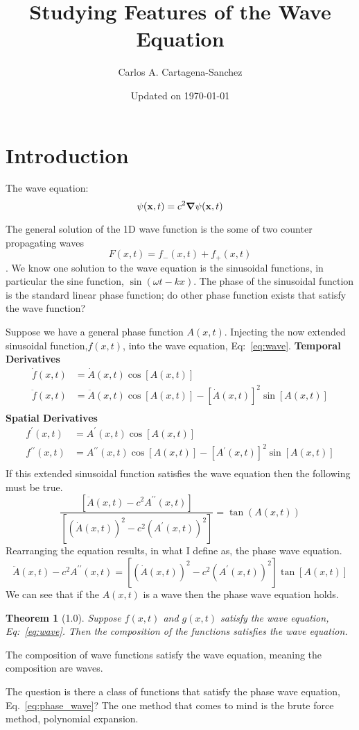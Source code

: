 \documentclass[12pt,reqno]{amsart}
\title{Studying Features of the Wave Equation}
\author{Carlos A. Cartagena-Sanchez}
\date{Updated on \today}
\newcommand*{\sprime}{^\ensuremath{\prime}}
\newcommand*{\dprime}{^{\ensuremath{\prime\prime}}}
\newcommand{\argument}{(\vb{x}, t)}
\newcommand{\argOne}{(x, t)}
\newtheorem*{theorem*}{Theorem}
\begin{document}
\maketitle

\section{Introduction}
The wave equation:
\begin{equation}\label{eq:wave}
    \psi \argument = c^2\grad{\psi \argument}
\end{equation}

The general solution of the 1D wave function is the some of two counter propagating waves\[F\argOne = f_-\argOne + f_+\argOne\].
We know one solution to the wave equation is the sinusoidal functions, in particular the sine function, $\sin{(\omega t - kx)}$. The phase of the sinusoidal function is the standard linear phase function; do other phase function exists that satisfy the wave function?

Suppose we have a general phase function $A\argOne$. Injecting the now extended sinusoidal function,$f\argOne$, into the wave equation, Eq:~\ref{eq:wave}.
\textbf{Temporal Derivatives}
\begin{align*}
    \dot{f}\argOne &= \dot A\argOne \cos[ A\argOne]\\
    \ddot{f}\argOne &= \ddot{A} \argOne \cos[ A\argOne] - [\dot A\argOne]^2\sin[A\argOne]\\
\end{align*}
\textbf{Spatial Derivatives}
\begin{align*}
    f\sprime \argOne &= A\sprime \argOne \cos[ A\argOne]\\
    f{\dprime}\argOne &= A{\dprime}\argOne \cos[ A\argOne] - [A{\sprime}\argOne]^2\sin[A\argOne]\\
\end{align*}
If this extended sinusoidal function satisfies the wave equation then the following must be true.
\begin{equation}
    \frac{[\ddot A\argOne - c^2A\dprime\argOne]}{[(\dot A\argOne)^2 - c^2(A\sprime\argOne)^2]} = \tan(A\argOne)
\end{equation}
Rearranging the equation results, in what I define as, the phase wave equation.
\begin{equation}\label{eq:phase_wave}
    \ddot A\argOne - c^2A\dprime\argOne = [(\dot A\argOne)^2 - c^2(A\sprime\argOne)^2]\tan[A\argOne]
\end{equation}
We can see that if the $A\argOne$ is a wave then the phase wave equation holds. 
\begin{theorem*}[1.0]
Suppose $f\argOne$ and $g\argOne$ satisfy the wave equation, Eq:~\ref{eq:wave}. Then the composition of the functions satisfies the wave equation.
\end{theorem*}
The composition of wave functions satisfy the wave equation, meaning the composition are waves.

The question is there a class of functions that satisfy the phase wave equation, Eq.~\ref{eq:phase_wave}? The one method that comes to mind is the brute force method, polynomial expansion.
\end{document}

